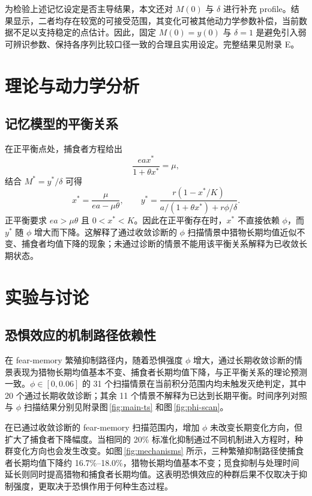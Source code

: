 \documentclass[12pt,a4paper]{ctexart}
\begin{document}
为检验上述记忆设定是否主导结果，本文还对 $M(0)$ 与 $\delta$ 进行补充 profile。结果显示，二者均存在较宽的可接受范围，其变化可被其他动力学参数补偿，当前数据不足以支持稳定的点估计。因此，固定 $M(0)=y(0)$ 与 $\delta=1$ 是避免引入弱可辨识参数、保持各序列比较口径一致的合理且实用设定。完整结果见附录 E。

\section{理论与动力学分析}

\subsection{记忆模型的平衡关系}

在正平衡点处，捕食者方程给出
\[
 \frac{eax^*}{1+\theta x^*}=\mu,
\]
结合 $M^*=y^*/\delta$ 可得
\[
 x^*=\frac{\mu}{ea-\mu\theta},
 \qquad
 y^*=
 \frac{r(1-x^*/K)}
 {a/(1+\theta x^*)+r\phi/\delta}.
\]
正平衡要求 $ea>\mu\theta$ 且 $0<x^*<K$。因此在正平衡存在时，$x^*$ 不直接依赖 $\phi$，而 $y^*$ 随 $\phi$ 增大而下降。这解释了通过收敛诊断的 $\phi$ 扫描情景中猎物长期均值近似不变、捕食者均值下降的现象；未通过诊断的情景不能用该平衡关系解释为已收敛长期状态。

\section{实验与讨论}

\subsection{恐惧效应的机制路径依赖性}

在 fear-memory 繁殖抑制路径内，随着恐惧强度 $\phi$ 增大，通过长期收敛诊断的情景表现为猎物长期均值基本不变、捕食者长期均值下降，与正平衡关系的理论预测一致。$\phi\in[0,0.06]$ 的 31 个扫描情景在当前积分范围内均未触发灭绝判定，其中 20 个通过长期收敛诊断；其余 11 个情景不解释为已达到长期平衡。时间序列对照与 $\phi$ 扫描结果分别见附录图\,\ref{fig:main-ts} 和图\,\ref{fig:phi-scan}。

在已通过收敛诊断的 fear-memory 扫描范围内，增加 $\phi$ 未改变长期变化方向，但扩大了捕食者下降幅度。当相同的 20\% 标准化抑制通过不同机制进入方程时，种群变化方向也会发生改变。如图\,\ref{fig:mechanisms} 所示，三种繁殖抑制路径使捕食者长期均值下降约 16.7\%--18.0\%，猎物长期均值基本不变；觅食抑制与处理时间延长则同时提高猎物和捕食者长期均值。这表明恐惧效应的种群后果不仅取决于抑制强度，更取决于恐惧作用于何种生态过程。
\end{document}
